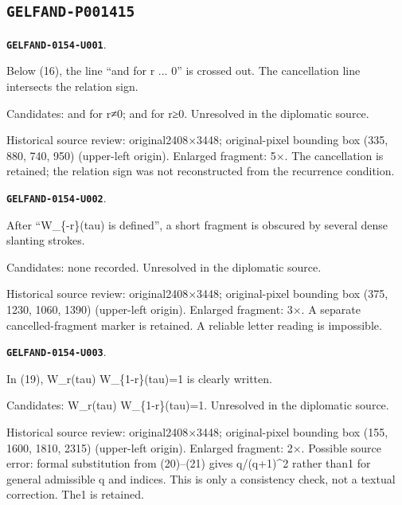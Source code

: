 \documentclass[11pt]{article}
\theoremstyle{definition}
\theoremstyle{remark}
\begin{document}
\subsection*{\texttt{GELFAND-P001415}}
\par\noindent\leavevmode{}\label{GELFAND-0154-U001}\label{GELFAND-P001415:eq16-cancelled:note}\textbf{\texttt{GELFAND-0154-U001}}.\nopagebreak[4]\par
Below (16), the line “and for r ... 0” is crossed out. The cancellation line intersects the relation sign.\par
Candidates: and for r≠0; and for r≥0. Unresolved in the diplomatic source.\par
Historical source review: original2408×3448; original-pixel bounding box (335, 880, 740, 950) (upper-left origin). Enlarged fragment: 5×. The cancellation is retained; the relation sign was not reconstructed from the recurrence condition.\par\medskip
\par\noindent\leavevmode{}\label{GELFAND-0154-U002}\label{GELFAND-P001415:continued-fraction-cancelled-word:note}\textbf{\texttt{GELFAND-0154-U002}}.\nopagebreak[4]\par
After “W\_\{-r\}(tau) is defined”, a short fragment is obscured by several dense slanting strokes.\par
Candidates: none recorded. Unresolved in the diplomatic source.\par
Historical source review: original2408×3448; original-pixel bounding box (375, 1230, 1060, 1390) (upper-left origin). Enlarged fragment: 3×. A separate cancelled-fragment marker is retained. A reliable letter reading is impossible.\par\medskip
\par\noindent\leavevmode{}\label{GELFAND-0154-U003}\label{GELFAND-P001415:eq19-right-hand-side:note}\textbf{\texttt{GELFAND-0154-U003}}.\nopagebreak[4]\par
In (19), W\_r(tau) W\_\{1-r\}(tau)=1 is clearly written.\par
Candidates: W\_r(tau) W\_\{1-r\}(tau)=1. Unresolved in the diplomatic source.\par
Historical source review: original2408×3448; original-pixel bounding box (155, 1600, 1810, 2315) (upper-left origin). Enlarged fragment: 2×. Possible source error: formal substitution from (20)–(21) gives q/(q+1)\textasciicircum{}2 rather than1 for general admissible q and indices. This is only a consistency check, not a textual correction. The1 is retained.\par\medskip
\end{document}

